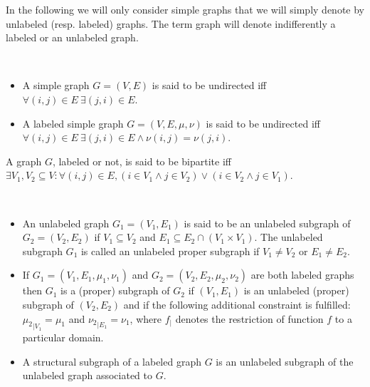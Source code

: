 In the following we will only consider simple graphs that we will
simply denote by unlabeled (resp. labeled) graphs.  The term graph
will denote indifferently a labeled or an unlabeled graph.
\begin{definition}\label{def:undirectedgraph}
~
\begin{itemize}
  \item A simple graph $G=(V,E)$ is said to be undirected iff\\
  $\forall (i,j) \in E ~ \exists (j,i) \in E$.
  \item A labeled simple graph $G=(V,E,\mu,\nu)$ is said to be undirected iff\\
  $\forall (i,j) \in E ~ \exists (j,i) \in E \land \nu(i,j) = \nu(j,i)$.
\end{itemize}
\end{definition}
\begin{definition}\label{def:bipartitegraphs}
  A graph $G$, labeled or not, is said to be bipartite
  iff \\ $\exists V_1, V_2 \subseteq V : \forall (i,j) \in E, (i \in V_1 \land j \in V_2) 
  \lor (i \in V_2 \land j \in V_1)$.
\end{definition}
\begin{definition}[Subgraph]\label{def:subgraph}
~
  \begin{itemize}
  \item An unlabeled graph $G_1=(V_1,E_1)$ is said to be an unlabeled
    subgraph of $G_2=(V_2,E_2)$ if $V_1\subseteq V_2$ and
    $E_1\subseteq E_2\cap (V_1\times V_1)$. The unlabeled subgraph $G_1$ is 
    called an unlabeled proper subgraph if $V_1\neq V_2$ or $E_1\neq
    E_2$.
  \item If $G_1=(V_1,E_1,\mu_1,\nu_1)$ and $G_2=(V_2,E_2,\mu_2,\nu_2)$
    are both labeled graphs then $G_1$ is a (proper) subgraph of $G_2$
    if
    $(V_1,E_1)$ is an unlabeled (proper) subgraph of $(V_2,E_2)$
    and if the
    following additional constraint is fulfilled: ${\mu_2}_{|V_1}=\mu_1$ and ${\nu_2}_{|E_1}=\nu_1$, where $f_{|}$ denotes the restriction of function $f$ to a
    particular domain.
  \item A structural subgraph of a labeled graph $G$ is an unlabeled
    subgraph of the unlabeled graph associated to $G$.
  \end{itemize}
\end{definition}











